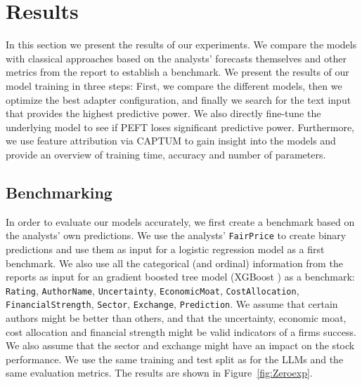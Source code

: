 \documentclass[conference]{IEEEtran}
\begin{document}
\section{Results}%
In this section we present the results of our experiments. We compare the models with classical approaches based on the analysts' forecasts themselves and other metrics from the report to establish a benchmark. We present the results of our model training in three steps: First, we compare the different models, then we optimize the best adapter configuration, and finally we search for the text input that provides the highest predictive power. We also directly fine-tune the underlying model to see if PEFT loses significant predictive power. Furthermore, we use feature attribution via CAPTUM to gain insight into the models and provide an overview of training time, accuracy and number of parameters.

\subsection{Benchmarking}%
In order to evaluate our models accurately, we first create a benchmark based on the analysts' own predictions. We use the analysts' \texttt{FairPrice} to create binary predictions and use them  as input for a logistic regression model as a first benchmark. We also use all the categorical (and ordinal) information from the reports as input for an gradient boosted tree model (XGBoost \cite{Russell2021}) as a benchmark: \texttt{Rating}, \texttt{AuthorName}, \texttt{Uncertainty}, \texttt{EconomicMoat}, \texttt{CostAllocation}, \texttt{FinancialStrength}, \texttt{Sector}, \texttt{Exchange}, \texttt{Prediction}. We assume that certain authors might be better than others, and that the uncertainty, economic moat, cost allocation and financial strength might be valid indicators of a firms success. We also assume that the sector and exchange might have an impact on the stock performance. We use the same training and test split as for the LLMs and the same evaluation metrics. The results are shown in Figure~\ref{fig:Zeroexp}.
\end{document}
